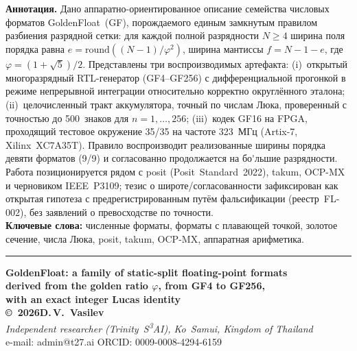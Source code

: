 \documentclass[12pt,a4paper]{article}
\begin{document}
\vspace{0.3cm}
\textbf{Аннотация.}
Дано аппаратно-ориентированное описание семейства числовых форматов GoldenFloat~(GF), порождаемого единым замкнутым правилом разбиения разрядной сетки: для каждой полной разрядности \(N\ge 4\) ширина поля порядка равна \(e=\mathrm{round}((N-1)/\varphi^{2})\), ширина мантиссы \(f=N-1-e\), где \(\varphi=(1+\sqrt5)/2\). Представлены три воспроизводимых артефакта: (i)~открытый многоразрядный RTL-генератор (GF4--GF256) с дифференциальной прогонкой в режиме непрерывной интеграции относительно корректно округлённого эталона; (ii)~целочисленный тракт аккумулятора, точный по числам Люка, проверенный с точностью до 500~знаков для \(n=1,\dots,256\); (iii)~кодек GF16 на FPGA, проходящий тестовое окружение 35/35 на частоте 323~МГц (Artix-7, Xilinx~XC7A35T). Правило воспроизводит реализованные ширины порядка девяти форматов (9/9) и согласованно продолжается на бо\'{}льшие разрядности. Работа позиционируется рядом с posit (Posit~Standard~2022), takum, OCP-MX и черновиком IEEE~P3109; тезис о широте/согласованности зафиксирован как открытая гипотеза с предрегистрированным путём фальсификации (реестр~FL-002), без заявлений о превосходстве по точности.\\[6pt]
\textbf{Ключевые слова:} численные форматы, форматы с плавающей точкой, золотое сечение, числа Люка, posit, takum, OCP-MX, аппаратная арифметика.

\vspace{0.5cm}
\hrule
\vspace{0.6cm}

\begin{center}
{\large\textbf{GoldenFloat: a family of static-split floating-point formats\\
derived from the golden ratio \(\varphi\), from GF4 to GF256,\\
with an exact integer Lucas identity}}\\[10pt]
\textbf{\copyright~2026\quad D.\,V.~Vasilev}\\[6pt]
\textit{Independent researcher (Trinity~S\textsuperscript{3}AI), Ko~Samui, Kingdom of Thailand}\\[4pt]
e-mail: admin@t27.ai \quad\textbar\quad ORCID: 0009-0008-4294-6159
\end{center}
\end{document}
